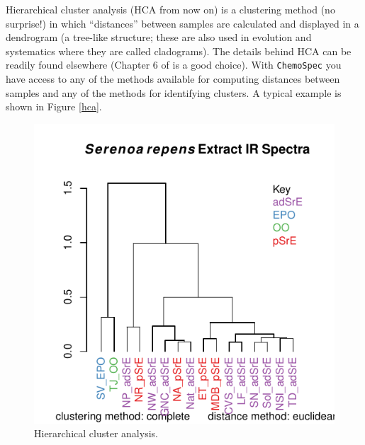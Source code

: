 \documentclass[letter,10pt,twocolumn,twoside,printwatermark=false]{pinp}
\begin{document}
\label{sec-hca} Hierarchical cluster analysis (HCA from now on) is a
clustering method (no surprise!) in which ``distances'' between samples
are calculated and displayed in a dendrogram (a tree-like structure;
these are also used in evolution and systematics where they are called
cladograms). The details behind HCA can be readily found elsewhere
(Chapter 6 of \cite{Filz} is a good choice). With \texttt{ChemoSpec} you
have access to any of the methods available for computing distances
between samples and any of the methods for identifying clusters. A
typical example is shown in Figure \ref{hca}.

\begin{Shaded}
\begin{Highlighting}[]
\StringTok{ }
\end{Highlighting}
\end{Shaded}

\begin{figure}

{\centering \includegraphics{ChemoSpec2_files/figure-latex/Chunk19-1} 

}

\caption{\label{hca}Hierarchical cluster analysis.}\label{fig:Chunk19}
\end{figure}
\end{document}
